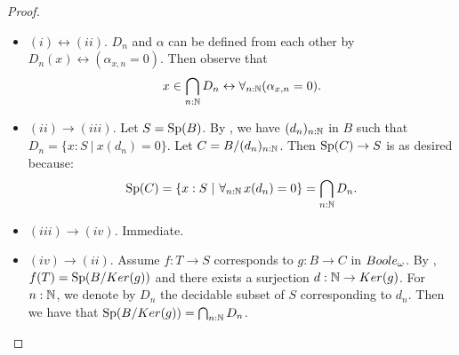\begin{proof}
\item 
  \begin{itemize}
  \item 
    $(i)\leftrightarrow (ii)$. $D_n$ and $\alpha$ can be defined from each other by 
     $D_n(x) \leftrightarrow (\alpha_{x,n} = 0)$. Then observe that
     \[
     x\in \bigcap_{n:\mathbb{N}} D_n \leftrightarrow 
      \forall_{n:\mathbb N} (\alpha_{x,n} = 0). 
     \]
     
   \item $(ii) \to (iii)$. Let $S=\operatorname{Sp}(B)$. 
      By , we have $(d_n)_{n:\mathbb{N}}$ in $B$ such that $D_n = \{x:S\ |\ x(d_n) = 0\}$. 
      Let $C = B/(d_n)_{n:\mathbb{N}}$.
      Then $\operatorname{Sp}(C) \to S$ is as desired because:
      \[\operatorname{Sp}(C) = \{x:S\ |\ \forall_{n:\mathbb{N}}\, x(d_n) =0\}  = \bigcap_{n:\mathbb{N}} D_n.\]
   \item $(iii) \to (iv)$. Immediate.
   \item $(iv) \to (ii)$. Assume $f:T\to S$ corresponds to $g:B\to C$ in $\Boole$. 
     By , $f(T) = \operatorname{Sp}(B/Ker(g))$ and 
     there exists a surjection $d:\mathbb{N}\to Ker(g)$. For $n:\mathbb{N}$, we denote by $D_n$ the decidable subset of $S$ corresponding to $d_n$. Then we have that $\operatorname{Sp}(B/Ker(g)) = \bigcap_{n:\mathbb{N}} D_n$. 
%

\end{itemize}
\end{proof}

